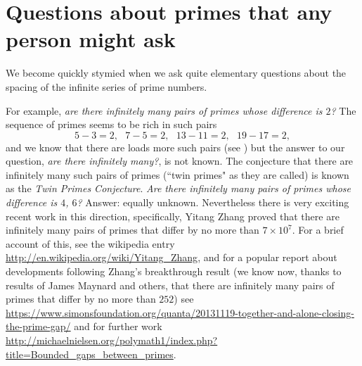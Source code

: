 \documentclass[openany]{book}
\theoremstyle{plain}
\theoremstyle{definition}
\begin{document}
%

%


\chapter[Questions about primes]{Questions about primes that any person might ask}

We become quickly stymied when we ask quite elementary questions about
the spacing of the infinite series of prime numbers.

For example, {\em are there infinitely many pairs of primes whose
  difference is $2$?}  The sequence of primes seems to be rich in such
pairs $$5-3 =2,\ \ \ 7-5=2,\ \ \ 13-11=2,\ \ \ 19-17 =2,$$ and we know
that there are loads more such pairs (see ) but the answer to our question,
{\em are there infinitely many?}, is not known. The conjecture that there are infinitely many such pairs of primes (``twin primes" as they are called) is known as the {\it Twin Primes Conjecture}.
{\em Are there
  infinitely many pairs of primes whose difference is $4$, $6$?}  Answer:
equally unknown.
Nevertheless there is very exciting recent work in this direction, specifically,
Yitang Zhang proved that there are infinitely many pairs of primes that differ
by no more than $7\times 10^7$. For a brief account of this, see the wikipedia entry \url{http://en.wikipedia.org/wiki/Yitang_Zhang}, and for a popular report  about developments following Zhang's breakthrough result (we know now, thanks to results of James Maynard and others, that there are infinitely many pairs of primes that differ
by no more than $252$) see \url{https://www.simonsfoundation.org/quanta/20131119-together-and-alone-closing-the-prime-gap/} and for further work
\url{http://michaelnielsen.org/polymath1/index.php?title=Bounded_gaps_between_primes}.
\end{document}
